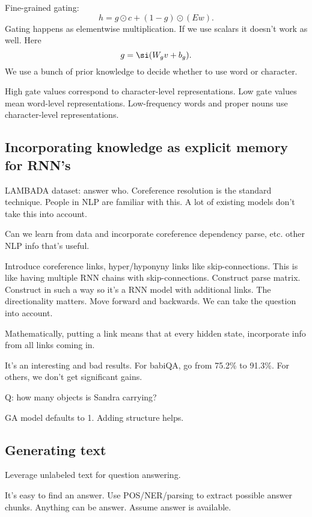 Fine-grained gating:
$$
h = g\odot c + (1-g)\odot (Ew).
$$
Gating happens as elementwise multiplication. If we use scalars it doesn't work as well.
Here
$$
g = \si(W_gv + b_g). 
$$
We use a bunch of prior knowledge to decide whether to use word or character.

High gate values correspond to character-level representations. Low gate values mean word-level representations. Low-frequency words and proper nouns use character-level representations.


\subsection{Incorporating knowledge as explicit memory for RNN's}


LAMBADA dataset: answer who. 
Coreference resolution is the standard technique. People in NLP are familiar with this. A lot of existing models don't take this into account. 

Can we learn from data and incorporate coreference dependency parse, etc. other NLP info that's useful.

Introduce coreference links, hyper/hyponyny links like skip-connections. This is like having  multiple RNN chains with skip-connections. Construct parse matrix. Construct in such a way so it's a RNN model with additional links.
The directionality matters. Move forward and backwards. We can take the question into account. 

Mathematically, putting a link means that at every hidden state, incorporate info from all links coming in.


It's an interesting and bad results. For babiQA, go from 75.2\% to 91.3\%. For others, we don't get significant gains.

Q: how many objects is Sandra carrying?

GA model defaults to 1. Adding structure helps.

\subsection{Generating text} %

Leverage unlabeled text for question answering.

It's easy to find an answer. Use POS/NER/parsing to extract possible answer chunks. Anything can be answer. Assume answer is available. 

